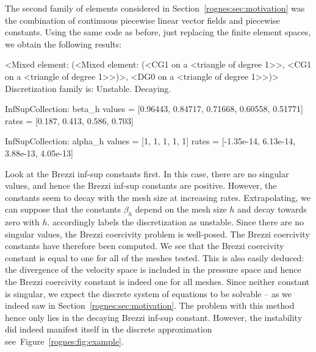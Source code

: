 The second family of elements considered in
Section~\ref{rognes:sec:motivation} was the combination of continuous
piecewise linear vector fields and piecewise constants. Using the same
code as before, just replacing the finite element spaces, we obtain
the following results:
\begin{progoutput}
<Mixed element: (<Mixed element: (<CG1 on a <triangle of degree 1>>,
<CG1 on a <triangle of degree 1>>)>, <DG0 on a <triangle of degree 1>>)>
Discretization family is: Unstable. Decaying.

InfSupCollection: beta_h
values =         [0.96443, 0.84717, 0.71668, 0.60558, 0.51771]
rates  =         [0.187, 0.413, 0.586, 0.703]

InfSupCollection: alpha_h
values =         [1, 1, 1, 1, 1]
rates  =         [-1.35e-14, 6.13e-14, 3.88e-13, 4.05e-13]
\end{progoutput}
Look at the Brezzi inf-sup constants first. In this case, there are no
singular values, and hence the Brezzi inf-sup constants are
positive. However, the constants seem to decay with the mesh size at
increasing rates. Extrapolating, we can suppose that the constants
$\beta_h$ depend on the mesh size $h$ and decay towards zero with
$h$. \rognesascot{} accordingly labels the discretization as
unstable. Since there are no singular values, the Brezzi coercivity
problem is well-posed. The Brezzi coercivity constants have therefore
been computed. We see that the Brezzi coercivity constant is equal to
one for all of the meshes tested. This is also easily deduced: the
divergence of the velocity space is included in the pressure space and
hence the Brezzi coercivity constant is indeed one for all
meshes. Since neither constant is singular, we expect the discrete
system of equations to be solvable -- as we indeed saw in
Section~\ref{rognes:sec:motivation}. The problem with this method
hence only lies in the decaying Brezzi inf-sup constant. However, the
instability did indeed manifest itself in the discrete approximation
see~Figure~\ref{rognes:fig:example}.

